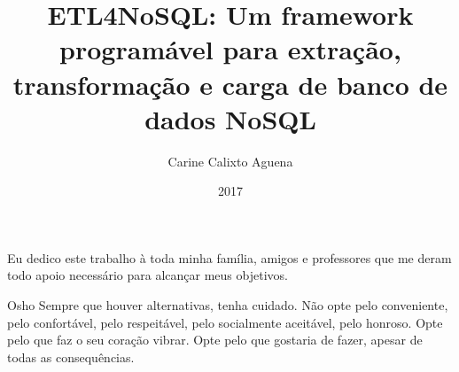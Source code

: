 \documentclass[pt,oneside,onehalfspacing,msc]{risethesis}
\title{ETL4NoSQL: Um framework programável para extração, transformação e carga de banco de dados NoSQL}
\date{2017}
\author{Carine Calixto Aguena}
\begin{document}
\frontmatter

\frontpage

\presentationpage



\begin{dedicatory}
Eu dedico este trabalho à toda minha família, amigos e professores que me deram todo apoio necessário para alcançar meus objetivos.
\end{dedicatory}

\acknowledgements


\begin{epigraph}[]{Osho}
Sempre que houver alternativas, tenha cuidado. Não opte pelo conveniente, pelo confortável, pelo respeitável, pelo socialmente aceitável, pelo honroso. 
Opte pelo que faz o seu coração vibrar. Opte pelo que gostaria de fazer, apesar de todas as consequências.
\end{epigraph}

\resumo
{\parindent0pt
	
}

\abstract
{\parindent0pt
	
}

\listoffigures

\listoftables

\listofacronyms


\tableofcontents

\mainmatter



%






\begin{references}
  
\end{references}


%
\end{document}
